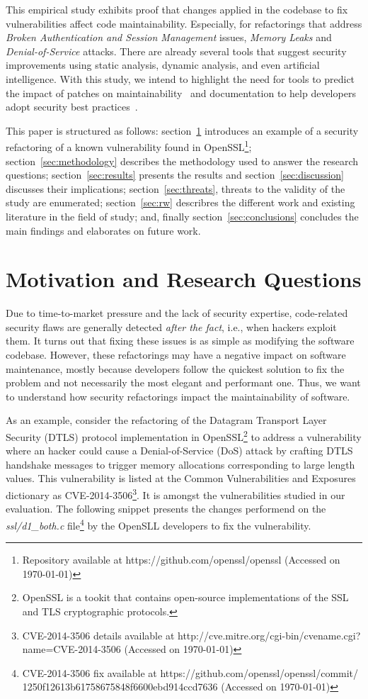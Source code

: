 \documentclass[10pt,conference]{IEEEtran}
\begin{document}
This empirical study exhibits proof that changes applied in the codebase to fix
vulnerabilities affect code maintainability. Especially, for refactorings that
address \emph{Broken Authentication and Session Management} issues, \emph{Memory
Leaks} and \emph{Denial-of-Service} attacks. There are already several tools that
suggest security improvements using static analysis, dynamic analysis, and even
artificial intelligence. With this study, we intend to highlight the need for tools
to predict the impact of patches on maintainability~\cite{4724577} and documentation
to help developers adopt security best practices~\cite{6311252, 7927935, MESQUIDA201519}.

This paper is structured as follows: section~\ref{sec:motivation} introduces an
example of a security refactoring of a known vulnerability found in
OpenSSL\footnote{Repository available at https://github.com/openssl/openssl
(Accessed on \today{})}; section~\ref{sec:methodology} describes the
methodology used to answer the research questions; section~\ref{sec:results}
presents the results and section~\ref{sec:discussion} discusses their
implications; section~\ref{sec:threats}, threats to the validity of the study
are enumerated; section~\ref{sec:rw} describres the different work and existing
literature in the field of study; and, finally section~\ref{sec:conclusions}
concludes the main findings and elaborates on future work.
%
\section{Motivation and Research Questions}\label{sec:motivation}
%
Due to time-to-market pressure and the lack of security expertise, code-related
security flaws are generally detected \textit{after the fact}, i.e., when
hackers exploit them. It turns out that fixing these issues is as simple as
modifying the software codebase. However, these refactorings may have a negative
impact on software maintenance, mostly because developers follow the quickest
solution to fix the problem and not necessarily the most elegant and performant
one. Thus, we want to understand how security refactorings impact the
maintainability of software.

As an example, consider the refactoring of the Datagram Transport Layer Security
(DTLS) protocol implementation in OpenSSL\footnote{OpenSSL is a tookit that
contains open-source implementations of the SSL and TLS cryptographic
protocols.} to address a vulnerability where an hacker could cause a Denial-of-Service
(DoS) attack by crafting DTLS handshake messages to trigger memory allocations
corresponding to large length values. This vulnerability is listed at the Common
Vulnerabilities and Exposures dictionary as CVE-2014-3506\footnote{CVE-2014-3506
details available at http://cve.mitre.org/cgi-bin/cvename.cgi?name=CVE-2014-3506
(Accessed on \today{})}. It is amongst the vulnerabilities studied in our
evaluation. The following snippet presents the changes performend on the
\emph{ssl/d1\_both.c} file\footnote{CVE-2014-3506 fix available  at
https://github.com/openssl/openssl/commit/\\1250f12613b61758675848f6600ebd914ccd7636
(Accessed on \today{})} by the OpenSLL developers to fix the vulnerability.
\end{document}
